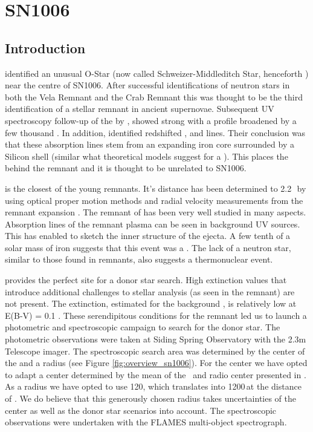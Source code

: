 \chapter{SN1006}
\label{chap:sn1006}


\section{Introduction}

\citet{1980ApJ...241.1039S} identified an unusual O-Star (now called Schweizer-Middleditch Star, henceforth \smstar) near the centre of SN1006. After successful identifications of neutron stars in both the Vela Remnant and the Crab Remnant this was thought to be the third identification of a stellar remnant in ancient supernovae. Subsequent UV spectroscopy follow-up of the \smstar by \citet{1983ApJ...269L...5W} , showed strong   with a profile broadened by a few thousand \kms. In addition, \citet{1983ApJ...269L...5W} identified redshifted ,  and  lines. Their conclusion was that these absorption lines stem from an expanding iron core surrounded by a Silicon shell (similar what theoretical models suggest for a \sneia). This places the \smstar behind the remnant and it is thought to be unrelated to SN1006. 

 is the closest of the young \snia remnants. It's distance has been determined to 2.2\,\kpc\ by using optical proper motion methods and radial velocity measurements from the remnant expansion \citep{2003ApJ...585..324W}. The remnant of  has been very well studied in many aspects. Absorption lines of the remnant plasma can be seen in background UV sources. This has enabled \citet{2005ApJ...624..189W} to sketch the inner structure of the ejecta. A few tenth of a solar mass of iron suggests that this event was a \snia. The lack of a neutron star, similar to those found in \snii remnants, also suggests a thermonuclear event. 

 provides the perfect site for a donor star search. High extinction values that introduce additional challenges to stellar analysis (as seen in the  remnant) are not present. The extinction, estimated for the background \smstar, is relatively low  at E(B-V) = 0.1 \citep{1993ApJ...416..247W,2003ApJ...585..324W}. These serendipitous conditions for the  remnant led us to launch a photometric and spectroscopic campaign to search for the donor star. The photometric observations were taken at Siding Spring Observatory with the 2.3m Telescope imager. The spectroscopic search area was determined by the center of the  and a radius (see Figure \ref{fig:overview_sn1006}). For the center we have opted to adapt a center determined by the mean of the \xray\ and radio center presented in \citet{2003ApJ...585..324W}. As a radius we have opted to use 120\arcsec, which translates into 1200\,\kms at the distance of . We do believe that this generously chosen radius takes uncertainties of the center as well as the donor star scenarios into account. The spectroscopic observations were undertaken with the FLAMES multi-object spectrograph.

